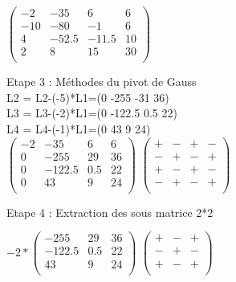 \vspace{5mm} %

$
\begin{pmatrix}
  -2  & -35   & 6     & 6 \\
  -10 & -80   & -1    & 6 \\
  4   & -52.5 & -11.5 & 10 \\
  2   & 8     & 15    & 30 \\
\end{pmatrix}
$

\vspace{8mm} %

Etape 3 : Méthodes du pivot de Gauss \\

L2 = L2-(-5)*L1=(0 -255 -31 36) \\
L3 = L3-(-2)*L1=(0 -122.5 0.5 22) \\
L4 = L4-(-1)*L1=(0 43 9 24) \\

\vspace{3mm} %
$
\begin{pmatrix}
 -2 & -35    & 6     & 6 \\
  0 & -255   & 29    & 36 \\
  0 & -122.5 & 0.5 & 22 \\
  0 & 43     & 9    & 24 \\
\end{pmatrix}
$
$
\begin{pmatrix}
 + & - & + & - \\
 - & + & - & + \\
 + & - & + & - \\
 - & + & - & + \\
\end{pmatrix}
$

\newpage

Etape 4 : Extraction des sous matrice 2*2
\vspace{5mm} %

$
-2*
\begin{pmatrix}
  -255   & 29   & 36 \\
  -122.5 & 0.5  & 22 \\
  43     & 9    & 24 \\
\end{pmatrix}
$
\vspace{5mm} %
$
\begin{pmatrix}
  + & - & + \\
  - & + & - \\
  + & - & + \\
\end{pmatrix}
$


